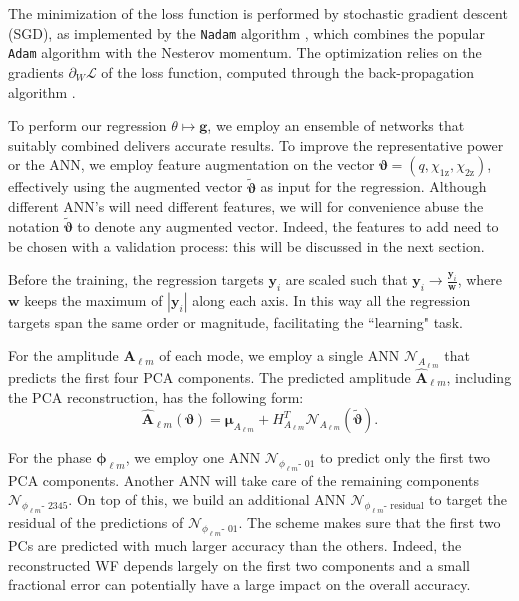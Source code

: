 \documentclass[twocolumn,showpacs,preprintnumbers,nofootinbib,prd,
superscriptaddress,10pt]{revtex4-1}
\begin{document}
The minimization of the loss function is performed by stochastic gradient descent (SGD), as implemented by the \texttt{Nadam} algorithm \cite{dozat.2016}, which combines the popular \texttt{Adam} algorithm \cite{Kingma2014AdamAM} with the Nesterov momentum. The optimization relies on the gradients $\partial_W \mathcal{L}$ of the loss function, computed through the 
back-propagation algorithm \cite{backprop}.

To perform our regression $\theta \longmapsto \boldsymbol{g}$, we employ an ensemble of networks that suitably combined delivers accurate results.
To improve the representative power or the ANN, we employ feature augmentation on the vector $\boldsymbol{\vartheta} = (q, \chi_\text{1z}, \chi_\text{2z})$, effectively using the augmented vector $\tilde{\boldsymbol{\vartheta}}$ as input for the regression. Although different ANN's will need different features, we will for convenience 
abuse the notation $\tilde{\boldsymbol{\vartheta}}$ to denote any augmented vector. Indeed, the features to add need to be chosen with a validation process: this will be discussed in the next section.

Before the training, the regression targets $\boldsymbol{y}_i$ are scaled such that $\boldsymbol{y}_i \rightarrow \frac{\boldsymbol{y}_i}{\boldsymbol{w}}$, where $\boldsymbol{w}$ keeps the maximum of $|\boldsymbol{y}_i|$ along each axis. %
In this way all the regression targets span the same order or magnitude, facilitating the ``learning" task.

For the amplitude $\boldsymbol{A}_{\ell m}$ of each mode, we employ a single ANN $\mathcal{N}_{A_{\ell m}}$ that predicts the first four PCA components.
The predicted amplitude $\hat{\boldsymbol{A}}_{\ell m}$, including the PCA reconstruction, has the following form:
\begin{equation}\label{eq:amp_pred}
	\hat{\boldsymbol{A}}_{\ell m}(\boldsymbol{\vartheta}) = \boldsymbol{\mu}_{A_{\ell m}} + H_{A_{\ell m}}^T \mathcal{N}_{A_{\ell m}}(\tilde{\boldsymbol{\vartheta}}).
\end{equation}

For the phase $\boldsymbol{\phi}_{\ell m}$, we employ one ANN $\mathcal{N}_{\phi_{\ell m}\text{- 01}}$ to predict only the first two PCA components.
Another ANN will take care of the remaining components $\mathcal{N}_{\phi_{\ell m}\text{- 2345}}$.
On top of this, we build an additional ANN $\mathcal{N}_{\phi_{\ell m}\text{- residual}}$ to target the residual of the predictions of $\mathcal{N}_{\phi_{\ell m}\text{- 01}}$.
The scheme makes sure that the first two PCs are predicted with much larger accuracy than the others. Indeed, the reconstructed WF depends largely on the first two components and a small fractional error can potentially have a large impact on the overall accuracy.
\end{document}
